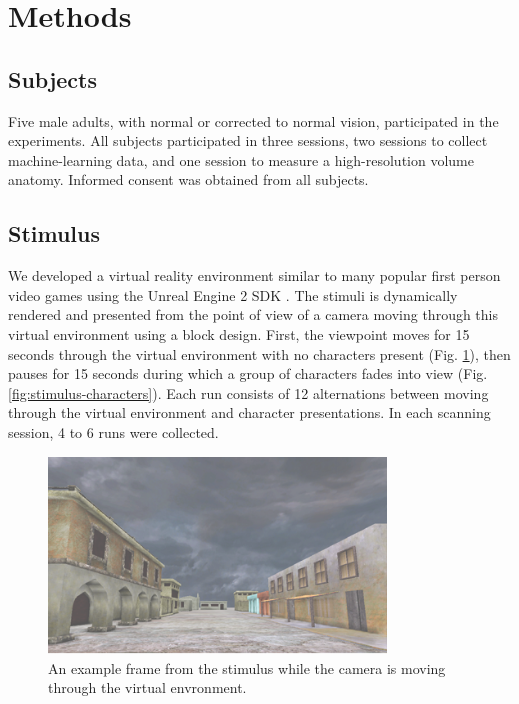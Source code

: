 \documentclass[preprint,5p,authoryear]{elsarticle}
\begin{document}
\section{Methods}

\subsection{Subjects}
Five male adults, with normal or corrected to normal vision, participated in the experiments. 
All subjects participated in three sessions, two sessions to collect machine-learning data, and one session to measure a high-resolution volume anatomy. 
Informed consent was obtained from all subjects.

\subsection{Stimulus}
We developed a virtual reality environment similar to many popular first person video games using the Unreal Engine 2 SDK \citep{UnrealEngine2}.
The stimuli is dynamically rendered and presented from the point of view of a camera moving through this virtual environment using a block design. 
First, the viewpoint moves for 15 seconds through the virtual environment with no characters present (Fig. \ref{fig:stimulus-movement}), then pauses for 15 seconds during which a group of characters fades into view (Fig. \ref{fig:stimulus-characters}). 
Each run consists of 12 alternations between moving through the virtual environment and character presentations. 
In each scanning session, 4 to 6 runs were collected.
\begin{figure}
\centering
\includegraphics[width=0.8\textwidth]{figures/stimulus-movement}
\caption{An example frame from the stimulus while the camera is moving through the virtual envronment.}
\label{fig:stimulus-movement}
\end{figure}
\end{document}
